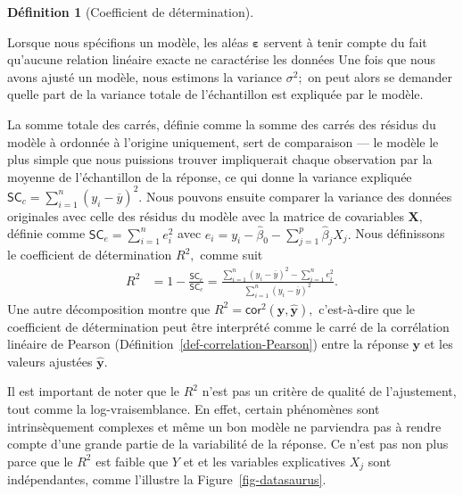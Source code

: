 \documentclass[
  11pt,
  letterpaper,
]{scrbook}
\theoremstyle{plain}
\theoremstyle{plain}
\theoremstyle{definition}
\theoremstyle{definition}
\newtheorem{definition}{Définition}[chapter]
\theoremstyle{remark}
\begin{document}
\begin{definition}[Coefficient de
détermination]\protect\hypertarget{def-r2}{}\label{def-r2}

Lorsque nous spécifions un modèle, les aléas
\(\boldsymbol{\varepsilon}\) servent à tenir compte du fait qu'aucune
relation linéaire exacte ne caractérise les données Une fois que nous
avons ajusté un modèle, nous estimons la variance \(\sigma^2;\) on peut
alors se demander quelle part de la variance totale de l'échantillon est
expliquée par le modèle.

La somme totale des carrés, définie comme la somme des carrés des
résidus du modèle à ordonnée à l'origine uniquement, sert de comparaison
--- le modèle le plus simple que nous puissions trouver impliquerait
chaque observation par la moyenne de l'échantillon de la réponse, ce qui
donne la variance expliquée
\(\mathsf{SC}_c = \sum_{i=1}^n (y_i - \overline{y})^2.\) Nous pouvons
ensuite comparer la variance des données originales avec celle des
résidus du modèle avec la matrice de covariables \(\mathbf{X},\) définie
comme \(\mathsf{SC}_e =\sum_{i=1}^n e_i^2\) avec
\(e_i = y_i - \widehat{\beta}_0 - \sum_{j=1}^p \widehat{\beta}_jX_j.\)
Nous définissons le coefficient de détermination \(R^2,\) comme suit
\begin{align*}
R^2 &=1- \frac{\mathsf{SC}_e}{\mathsf{SC}_c} = \frac{\sum_{i=1}^n (y_i - \overline{y})^2- \sum_{i=1}^n e_i^2}{\sum_{i=1}^n (y_i - \overline{y})^2}.
\end{align*} Une autre décomposition montre que
\(R^2 = \mathsf{cor}^2(\boldsymbol{y}, \widehat{\boldsymbol{y}}),\)
c'est-à-dire que le coefficient de détermination peut être interprété
comme le carré de la corrélation linéaire de Pearson
(Définition~\ref{def-correlation-Pearson}) entre la réponse
\(\boldsymbol{y}\) et les valeurs ajustées \(\widehat{\boldsymbol{y}}.\)

\end{definition}

Il est important de noter que le \(R^2\) n'est pas un critère de qualité
de l'ajustement, tout comme la log-vraisemblance. En effet, certain
phénomènes sont intrinsèquement complexes et même un bon modèle ne
parviendra pas à rendre compte d'une grande partie de la variabilité de
la réponse. Ce n'est pas non plus parce que le \(R^2\) est faible que
\(Y\) et et les variables explicatives \(X_j\) sont indépendantes, comme
l'illustre la Figure~\ref{fig-datasaurus}.
\end{document}

